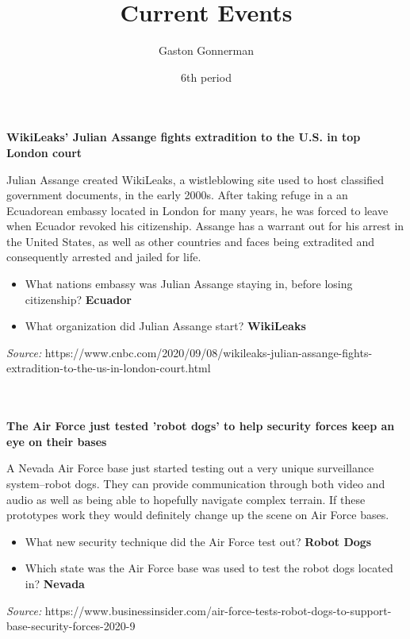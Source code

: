 \documentclass{article}
\title{Current Events}
\author{Gaston Gonnerman}
\date{6th period}
\begin{document}
	\maketitle
	
	\begin{center}
		\large{
			\textbf{WikiLeaks’ Julian Assange fights extradition to the U.S. in top London court}
		}
	\end{center}
	\par Julian Assange created WikiLeaks, a wistleblowing site used to host classified government documents, in the early 2000s. After taking refuge in a an Ecuadorean embassy located in London for many years, he was forced to leave when Ecuador revoked his citizenship. Assange has a warrant out for his arrest in the United States, as well as other countries and faces being extradited and consequently arrested and jailed for life.
	
	\begin{itemize}[label=--]
		\item What nations embassy was Julian Assange staying in, before losing citizenship? \textbf{Ecuador}
		\item What organization did Julian Assange start? \textbf{WikiLeaks}
	\end{itemize}

	\noindent
	\emph{Source:} https://www.cnbc.com/2020/09/08/wikileaks-julian-assange-fights-extradition-to-the-us-in-london-court.html
	\\ \\ \\
	
	\begin{center}
		\large{
			\textbf{The Air Force just tested 'robot dogs' to help security forces keep an eye on their bases}
		}
	\end{center}
	\par A Nevada Air Force base just started testing out a very unique surveillance system--robot dogs. They can provide communication through both video and audio as well as being able to hopefully navigate complex terrain. If these prototypes work they would definitely change up the scene on Air Force bases.
	
	\begin{itemize}[label=--]
		\item What new security technique did the Air Force test out? \textbf{Robot Dogs}
		\item Which state was the Air Force base was used to test the robot dogs located in? \textbf{Nevada}
	\end{itemize}

	\noindent
	\emph{Source:} https://www.businessinsider.com/air-force-tests-robot-dogs-to-support-base-security-forces-2020-9
\end{document}
